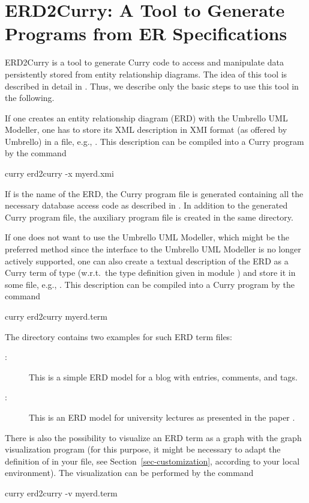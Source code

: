 \section{ERD2Curry: A Tool to Generate Programs from ER Specifications}
\label{sec-erd2curry}

ERD2Curry
is a tool to generate Curry code to access and manipulate data
persistently stored from
entity relationship diagrams.
The idea of this tool is described in detail in
\cite{BrasselHanusMueller08PADL}.
Thus, we describe only the basic steps to use this tool
in the following.

If one creates an entity relationship diagram (ERD)
with the Umbrello UML Modeller, one has to store its
XML description in XMI format (as offered by Umbrello)
in a file, e.g., .
This description can be compiled into a Curry program by the
command
\begin{curry}
curry erd2curry -x myerd.xmi
\end{curry}
If  is the name of the ERD, the Curry program file
 is generated containing all the necessary
database access code as described in \cite{BrasselHanusMueller08PADL}.
In addition to the generated Curry program file,
the auxiliary program file 
is created in the same directory.

If one does not want to use the Umbrello UML Modeller,
which might be the preferred method since the interface to the
Umbrello UML Modeller is no longer actively supported,
one can also create a textual description of the ERD
as a Curry term of type 
(w.r.t.\ the type definition given in module
)
and store it in some file, e.g., .
This description can be compiled into a Curry program by the
command
\begin{curry}
curry erd2curry myerd.term
\end{curry}
%
The directory 
contains two examples for such ERD term files:
\begin{description}
\item[:]
This is a simple ERD model for a blog with entries, comments,
and tags.
\item[:]
This is an ERD model for university lectures as
presented in the paper \cite{BrasselHanusMueller08PADL}.
\end{description}
%
There is also the possibility to visualize an ERD term
as a graph with the graph visualization program 
(for this purpose, it might be necessary to adapt the definition
of  in your \ccode{\curryrc} file,
see Section~\ref{sec-customization},
according to your local environment).
The visualization can be performed by the command
\begin{curry}
curry erd2curry -v myerd.term
\end{curry}

